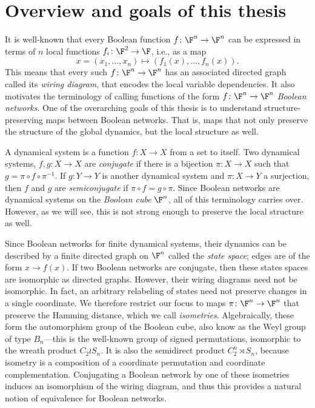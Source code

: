 

\section{Overview and goals of this thesis}

It is well-known that every Boolean function $f\colon\F^n\to\F^n$ can be expressed in terms of $n$ local functions $f_i\colon\F^2\to\F$, i.e., as a map
\[
x=(x_1,\dots,x_n)\longmapsto (f_1(x),\dots,f_n(x)).
\]
This means that every such $f\colon\F^n\to\F^n$ has an associated directed graph called its \emph{wiring diagram}, that encodes the local variable dependencies. It also motivates the terminology of calling functions of the form $f\colon\F^n\to\F^n$ \emph{Boolean networks}. One of the overarching goals of this thesis is to understand structure-preserving maps between Boolean networks. That is, maps that not only preserve the structure of the global dynamics, but the local structure as well.

A dynamical system is a function $f\colon X\to X$ from a set to itself. Two dynamical systems, $f,g\colon X\to X$ are \emph{conjugate} if there is a bijection $\pi\colon X\to X$ such that $g=\pi\circ f\circ\pi^{-1}$. If $g\colon Y\to Y$ is another dynamical system and $\pi\colon X\to Y$ a surjection, then $f$ and $g$ are \emph{semiconjugate} if $\pi\circ f=g\circ\pi$. Since Boolean networks are dynamical systems on the \emph{Boolean cube} $\F^n$, all of this terminology carries over. However, as we will see, this is not strong enough to preserve the local structure as well.

Since Boolean networks for finite dynamical systems, their dynamics can be described by a finite directed graph on $\F^n$ called the \emph{state space}; edges are of the form $x\to f(x)$. If two Boolean networks are conjugate, then these states spaces are isomorphic as directed graphs. However, their wiring diagrams need not be isomorphic. In fact, an arbitrary relabeling of states need not preserve changes in a single coordinate. We therefore restrict our focus to maps $\pi\colon\F^n\to\F^n$ that preserve the Hamming distance, which we call \emph{isometries}. Algebraically, these form the automorphism group of the Boolean cube, also know as the Weyl group of type $B_n$---this is the well-known group of signed permutations, isomorphic to the wreath product $C_2\wr S_n$. It is also the  semidirect product $C_2^n\rtimes S_n$, because isometry is a composition of a coordinate permutation and coordinate complementation. Conjugating a Boolean network by one of these isometries induces an isomorphism of the wiring diagram, and thus this provides a natural notion of equivalence for Boolean networks.

